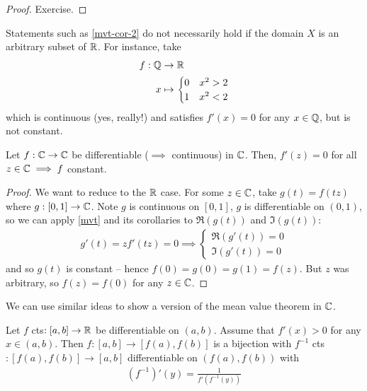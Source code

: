 \documentclass{../../template/note}
\begin{document}
    \begin{proof}
        Exercise.
    \end{proof}
    
    \begin{remark*}
        Statements such as \cref{mvt-cor-2} do not necessarily hold if the domain \(X\) is an arbitrary subset of \(\mathbb R\). For instance, take
        \begin{align*}
            f: \mathbb Q &\to \mathbb R \\
            x &\mapsto \begin{cases}
                0 & x^2 > 2 \\
                1 & x^2 < 2
            \end{cases}
        \end{align*}
        which is continuous (yes, really!) and satisfies \(f'(x) = 0\) for any \(x \in \mathbb Q\), but is not constant.        
    \end{remark*}
    
    \begin{lemma}
        Let \(f: \mathbb C \to \mathbb C\) be differentiable (\(\implies\) continuous) in \(\mathbb C\). Then, \(f'(z) = 0\) for all \(z \in \mathbb C \implies f\) constant.
    \end{lemma}
    
    \begin{proof}
        We want to reduce to the \(\mathbb R\) case. For some \(z \in \mathbb C\), take \(g(t) = f(tz)\) where \(g: [0, 1] \to \mathbb C\). Note \(g\) is continuous on \([0, 1]\), \(g\) is differentiable on \((0, 1)\), so we can apply \cref{mvt} and its corollaries to \(\Re(g(t))\) and \(\Im(g(t))\):
        \begin{align*}
            g'(t) = zf'(tz) = 0 \implies \begin{cases}
                \Re(g'(t)) = 0 \\
                \Im(g'(t)) = 0
            \end{cases}
        \end{align*}
        and so \(g(t)\) is constant -- hence \(f(0) = g(0) = g(1) = f(z)\). But \(z\) was arbitrary, so \(f(z) = f(0)\) for any \(z \in \mathbb C\).
    \end{proof}
    
    \begin{remark*}
        We can use similar ideas to show a version of the mean value theorem in \(\mathbb C\).
    \end{remark*}
    
    \begin{theorem}
        \label{ift-2}
        Let \(f\) cts\(: [a, b] \to \mathbb R\) be differentiable on \((a, b)\). Assume that \(f'(x) > 0\) for any \(x \in (a, b)\). Then \(f: [a, b] \to [f(a), f(b)]\) is a bijection with \(f^{-1}\) cts\(: [f(a), f(b)] \to [a, b]\) differentiable on \((f(a), f(b))\) with
        \begin{align*}
            (f^{-1})'(y) = \frac 1 {f'(f^{-1}(y))}
        \end{align*}
    \end{theorem}
    
\end{document}
